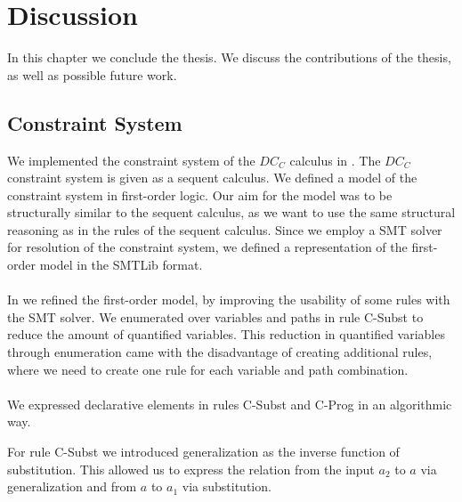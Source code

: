 \chapter{Discussion}
\label{chp:discuss}
In this chapter we conclude the thesis.
We discuss the contributions of the thesis,
as well as possible future work.

\section{Constraint System}
We implemented the constraint system of the $DC_C$ calculus
in .
The $DC_C$ constraint system is given as a sequent calculus.
We defined a model of the constraint system in first-order logic.
Our aim for the model was to be structurally similar to the sequent calculus,
as we want to use the same structural reasoning
as in the rules of the sequent calculus.
Since we employ a SMT solver for resolution of the constraint system,
we defined a representation of the first-order model in the SMTLib format.\\
\\
In  we refined the first-order model,
by improving the usability of some rules with the SMT solver.
We enumerated over variables and paths in rule C-Subst
to reduce the amount of quantified variables.
This reduction in quantified variables through enumeration came
with the disadvantage of creating additional rules,
where we need to create one rule for each variable and path combination.\\
\\
We expressed declarative elements in rules C-Subst and C-Prog in an algorithmic way.

For rule C-Subst we introduced generalization as the inverse function of substitution.
This allowed us to express the relation from the input $a_2$ to $a$ via generalization
and from $a$ to $a_1$ via substitution.

